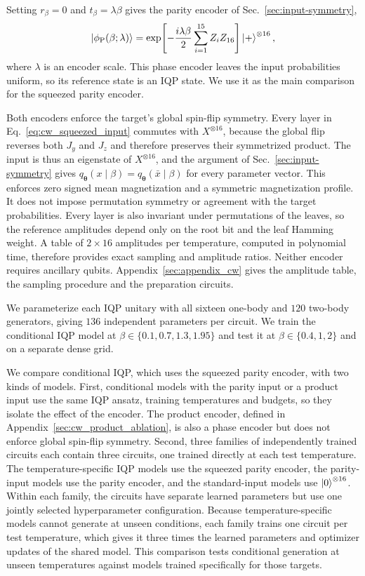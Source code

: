 \documentclass[pra,aps,10pt,twocolumn,floatfix,superscriptaddress, notitlepage,longbibliography]{revtex4-2}
\begin{document}
Setting $r_\beta=0$ and $t_\beta=\lambda\beta$ gives the parity encoder of Sec.~\ref{sec:input-symmetry},
\begin{equation}
 \ket{\phi_{\mathrm P}(\beta;\lambda)}=
 \exp\!\left[-\frac{i \lambda\beta}{2}\sum_{i=1}^{15}Z_iZ_{16}\right]
 \ket{+}^{\otimes16},
 \label{eq:cw_parity_input}
\end{equation}
where $\lambda$ is an encoder scale. This phase encoder leaves the input probabilities uniform, so its reference state is an IQP state. We use it as the main comparison for the squeezed parity encoder.

Both encoders enforce the target's global spin-flip symmetry. Every layer in Eq.~\eqref{eq:cw_squeezed_input} commutes with $X^{\otimes16}$, because the global flip reverses both $J_y$ and $J_z$ and therefore preserves their symmetrized product. The input is thus an eigenstate of $X^{\otimes16}$, and the argument of Sec.~\ref{sec:input-symmetry} gives $q_{\boldsymbol\theta}(x\mid\beta)=q_{\boldsymbol\theta}(\bar x\mid\beta)$ for every parameter vector. This enforces zero signed mean magnetization and a symmetric magnetization profile. It does not impose permutation symmetry or agreement with the target probabilities. Every layer is also invariant under permutations of the leaves, so the reference amplitudes depend only on the root bit and the leaf Hamming weight. A table of $2\times16$ amplitudes per temperature, computed in polynomial time, therefore provides exact sampling and amplitude ratios. Neither encoder requires ancillary qubits. Appendix~\ref{sec:appendix_cw} gives the amplitude table, the sampling procedure and the preparation circuits.

We parameterize each IQP unitary with all sixteen one-body and $120$ two-body generators, giving $136$ independent parameters per circuit. We train the conditional IQP model at $\beta\in\{0.1,0.7,1.3,1.95\}$ and test it at $\beta\in\{0.4,1,2\}$ and on a separate dense grid.

We compare conditional IQP, which uses the squeezed parity encoder, with two kinds of models. First, conditional models with the parity input or a product input use the same IQP ansatz, training temperatures and budgets, so they isolate the effect of the encoder. The product encoder, defined in Appendix~\ref{sec:cw_product_ablation}, is also a phase encoder but does not enforce global spin-flip symmetry. Second, three families of independently trained circuits each contain three circuits, one trained directly at each test temperature. The temperature-specific IQP models use the squeezed parity encoder, the parity-input models use the parity encoder, and the standard-input models use $\ket{0}^{\otimes16}$. Within each family, the circuits have separate learned parameters but use one jointly selected hyperparameter configuration. Because temperature-specific models cannot generate at unseen conditions, each family trains one circuit per test temperature, which gives it three times the learned parameters and optimizer updates of the shared model. This comparison tests conditional generation at unseen temperatures against models trained specifically for those targets.
\end{document}
